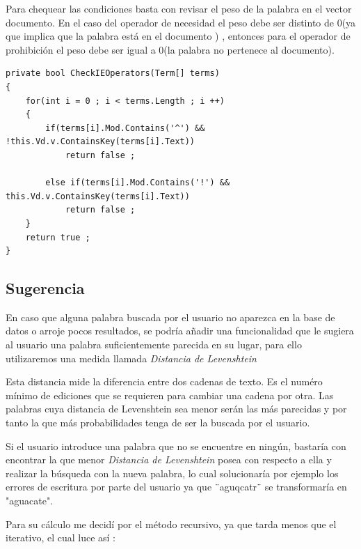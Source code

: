 \documentclass{article}
\begin{document}
Para chequear las condiciones basta con revisar el peso de la palabra en el vector documento. En el caso del operador de
necesidad el peso debe ser distinto de 0(ya que implica que la palabra está en el documento ) , entonces para el operador de prohibición
el peso debe ser igual a 0(la palabra no pertenece al documento). \\[5pt]

\newpage

\begin{lstlisting}
private bool CheckIEOperators(Term[] terms)
{
    for(int i = 0 ; i < terms.Length ; i ++)
    {
        if(terms[i].Mod.Contains('^') && !this.Vd.v.ContainsKey(terms[i].Text))
            return false ;
            
        else if(terms[i].Mod.Contains('!') && this.Vd.v.ContainsKey(terms[i].Text))
            return false ;
    }
    return true ;
}    
\end{lstlisting}

\subsection{Sugerencia}
En caso que alguna palabra buscada por el usuario no aparezca en la base de datos o arroje pocos resultados, se podría añadir una funcionalidad que
le sugiera al usuario una palabra suficientemente parecida en su lugar, para ello utilizaremos una medida llamada \textit{Distancia de Levenshtein}

Esta distancia mide la diferencia entre dos cadenas de texto. Es el numéro mínimo de ediciones que se requieren para cambiar una cadena por otra. Las palabras
cuya distancia de Levenshtein sea menor serán las más parecidas y por tanto la que más probabilidades tenga de ser la buscada por el usuario.

Si el usuario introduce una palabra que no se encuentre en ningún, bastaría con encontrar la que menor \textit{Distancia de Levenshtein} posea con respecto
a ella y realizar la búsqueda con la nueva palabra, lo cual solucionaría por ejemplo los errores de escritura por parte del usuario ya que ¨aguqcatr¨ se transformaría
en "aguacate".

Para su cálculo me decidí por el método recursivo, ya que tarda menos que el iterativo, el cual luce así :
\newpage
\end{document}
